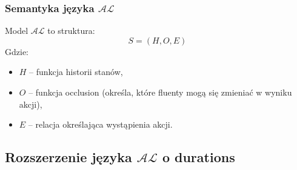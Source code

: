 \documentclass{article}
\begin{document}
\subsubsection{Semantyka języka $\mathcal{AL}$}
Model $\mathcal{AL}$ to struktura:
\[S = (H, O, E)\]
Gdzie:
\begin{itemize}
    \item $H$ – funkcja historii stanów,
    \item $O$ – funkcja occlusion (określa, które fluenty mogą się zmieniać w wyniku akcji),
    \item $E$ – relacja określająca wystąpienia akcji.
\end{itemize}

\subsection{Rozszerzenie języka \texorpdfstring{$\mathcal{AL}$}{AL} o durations}
\label{sec:opis-jezyka-al-z-durations}
\end{document}
